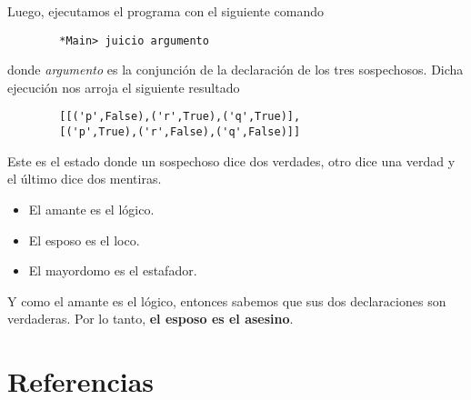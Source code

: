 \documentclass[letterpaper,12pt]{article}
\begin{document}
    Luego, ejecutamos el programa con el siguiente comando
    \begin{lstlisting}
        *Main> juicio argumento
    \end{lstlisting}

    donde \textit{argumento} es la conjunción de la declaración de los 
    tres sospechosos. Dicha ejecución nos arroja el siguiente resultado
    \begin{lstlisting}
        [[('p',False),('r',True),('q',True)],
        [('p',True),('r',False),('q',False)]]
    \end{lstlisting}

    Este es el estado donde un sospechoso dice dos verdades, otro dice una 
    verdad y el último dice dos mentiras. 
    \begin{itemize}
        \item El amante es el lógico.
        \item El esposo es el loco.
        \item El mayordomo es el estafador.
    \end{itemize}

    Y como el amante es el lógico, entonces sabemos que sus dos declaraciones
    son verdaderas. Por lo tanto, \textbf{el esposo es el asesino}.

    \section{Referencias}
    
\end{document}
